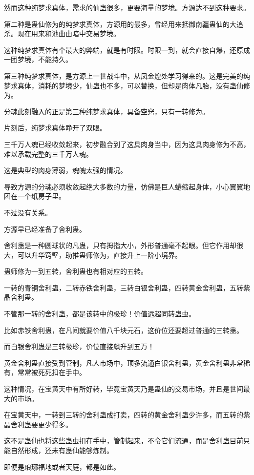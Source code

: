 \begin{this_body}
然而这种纯梦求真体，需求的仙蛊很多，更要海量的梦境。方源达不到这种要求。

第二种是蛊仙修为的纯梦求真体，方源用的最多，曾经用来抵御南疆蛊仙的大追杀。现在用来和池曲由暗中交易梦境。

这种纯梦求真体有个最大的弊端，就是有时限。时限一到，就会直接自爆，还原成一团梦境，不能持久。

第三种纯梦求真体，是方源上一世战斗中，从凤金煌处学习得来的。这是完美的纯梦求真体，消耗的梦境少，仙蛊也不多，可以替换，但却是肉体凡胎，没有蛊仙修为。

分魂此刻融入的正是第三种纯梦求真体，具备空窍，只有一转修为。

片刻后，纯梦求真体睁开了双眼。

三千万人魂已经收敛起来，初步融合到了这具肉身当中，因为这具肉身修为不高，难以承载完整的三千万人魂。

这是典型的肉身薄弱，魂魄太强的情况。

导致方源的分魂必须收敛起绝大多数的力量，仿佛是巨人蜷缩起身体，小心翼翼地团在一个纸房子里。

不过没有关系。

方源早已经准备了舍利蛊。

舍利蛊是一种圆球状的凡蛊，只有拇指大小，外形普通毫不起眼。但它作用却很大，可以升华窍壁，助推蛊师修为，直接升上一阶小境界。

蛊师修为一到五转，舍利蛊也有相对应的五转。

一转的青铜舍利蛊，二转赤铁舍利蛊，三转白银舍利蛊，四转黄金舍利蛊，五转紫晶舍利蛊。

不管那一转的舍利蛊，都是该转中的极珍！价值远超同转蛊虫。

比如赤铁舍利蛊，在凡间就要价值八千块元石，这价位还要超过普通的三转蛊。

而白银舍利蛊是三转极珍，价位直接飙升到五万！

黄金舍利蛊直接受到管制，凡人市场中，顶多流通白银舍利蛊，黄金舍利蛊非常稀有，常常被死死扣在手中。

这种情况，在宝黄天中有所好转，毕竟宝黄天乃是蛊仙的交易市场，并且是世间最大的市场。

在宝黄天中，一转到三转的舍利蛊成打卖，四转的黄金舍利蛊少许多，而五转的紫晶舍利蛊要更少得多。

这不是蛊仙也将这些蛊虫扣在手中，管制起来，不令它们流通，而是舍利蛊目前只能自然形成，还未有蛊仙能够炼制。

即便是琅琊福地或者天庭，都是如此。


\end{this_body}
